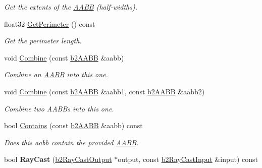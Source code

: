 \begin{DoxyCompactItemize}
\begin{DoxyCompactList}\small\item\em Get the extents of the \hyperlink{classAABB}{A\+A\+BB} (half-\/widths). \end{DoxyCompactList}\item 
\mbox{\label{structb2AABB_a25d2504d2f2fdec88f9347f62f112268}} 
float32 \hyperlink{structb2AABB_a25d2504d2f2fdec88f9347f62f112268}{Get\+Perimeter} () const
\begin{DoxyCompactList}\small\item\em Get the perimeter length. \end{DoxyCompactList}\item 
\mbox{\label{structb2AABB_ad551edba62d2ad6094672a9ba3e26496}} 
void \hyperlink{structb2AABB_ad551edba62d2ad6094672a9ba3e26496}{Combine} (const \hyperlink{structb2AABB}{b2\+A\+A\+BB} \&aabb)
\begin{DoxyCompactList}\small\item\em Combine an \hyperlink{classAABB}{A\+A\+BB} into this one. \end{DoxyCompactList}\item 
\mbox{\label{structb2AABB_a34b9c7d824df845c10caa9c12ae90452}} 
void \hyperlink{structb2AABB_a34b9c7d824df845c10caa9c12ae90452}{Combine} (const \hyperlink{structb2AABB}{b2\+A\+A\+BB} \&aabb1, const \hyperlink{structb2AABB}{b2\+A\+A\+BB} \&aabb2)
\begin{DoxyCompactList}\small\item\em Combine two A\+A\+B\+Bs into this one. \end{DoxyCompactList}\item 
\mbox{\label{structb2AABB_acf98175d3a53bca755d5c4852fa85a00}} 
bool \hyperlink{structb2AABB_acf98175d3a53bca755d5c4852fa85a00}{Contains} (const \hyperlink{structb2AABB}{b2\+A\+A\+BB} \&aabb) const
\begin{DoxyCompactList}\small\item\em Does this aabb contain the provided \hyperlink{classAABB}{A\+A\+BB}. \end{DoxyCompactList}\item 
\mbox{\label{structb2AABB_af6a8b26716ec07d326e5ce95556e8c7e}} 
bool {\bfseries Ray\+Cast} (\hyperlink{structb2RayCastOutput}{b2\+Ray\+Cast\+Output} $\ast$output, const \hyperlink{structb2RayCastInput}{b2\+Ray\+Cast\+Input} \&input) const
\end{DoxyCompactItemize}
